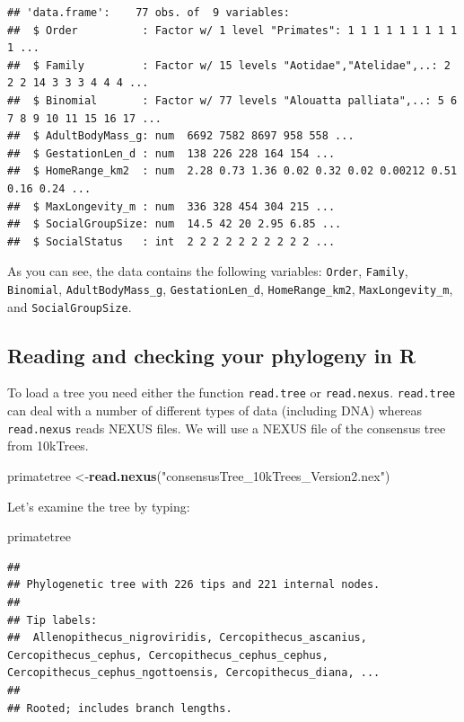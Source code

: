 \documentclass[]{book}
\newenvironment{Shaded}{\begin{snugshade}}{\end{snugshade}}
\newcommand{\KeywordTok}[1]{\textcolor[rgb]{0.13,0.29,0.53}{\textbf{{#1}}}}
\newcommand{\StringTok}[1]{\textcolor[rgb]{0.31,0.60,0.02}{{#1}}}
\newcommand{\NormalTok}[1]{{#1}}
\theoremstyle{definition}
\theoremstyle{definition}
\theoremstyle{definition}
\theoremstyle{remark}
\begin{document}
\begin{verbatim}
## 'data.frame':    77 obs. of  9 variables:
##  $ Order          : Factor w/ 1 level "Primates": 1 1 1 1 1 1 1 1 1 1 ...
##  $ Family         : Factor w/ 15 levels "Aotidae","Atelidae",..: 2 2 2 14 3 3 3 4 4 4 ...
##  $ Binomial       : Factor w/ 77 levels "Alouatta palliata",..: 5 6 7 8 9 10 11 15 16 17 ...
##  $ AdultBodyMass_g: num  6692 7582 8697 958 558 ...
##  $ GestationLen_d : num  138 226 228 164 154 ...
##  $ HomeRange_km2  : num  2.28 0.73 1.36 0.02 0.32 0.02 0.00212 0.51 0.16 0.24 ...
##  $ MaxLongevity_m : num  336 328 454 304 215 ...
##  $ SocialGroupSize: num  14.5 42 20 2.95 6.85 ...
##  $ SocialStatus   : int  2 2 2 2 2 2 2 2 2 2 ...
\end{verbatim}

As you can see, the data contains the following variables:
\texttt{Order}, \texttt{Family}, \texttt{Binomial},
\texttt{AdultBodyMass\_g}, \texttt{GestationLen\_d},
\texttt{HomeRange\_km2}, \texttt{MaxLongevity\_m}, and
\texttt{SocialGroupSize}.

\subsection{Reading and checking your phylogeny in
R}\label{reading-and-checking-your-phylogeny-in-r}

To load a tree you need either the function \texttt{read.tree} or
\texttt{read.nexus}. \texttt{read.tree} can deal with a number of
different types of data (including DNA) whereas \texttt{read.nexus}
reads NEXUS files. We will use a NEXUS file of the consensus tree from
10kTrees.

\begin{Shaded}
\begin{Highlighting}[]
\NormalTok{primatetree <-}\KeywordTok{read.nexus}\NormalTok{(}\StringTok{"consensusTree_10kTrees_Version2.nex"}\NormalTok{)}
\end{Highlighting}
\end{Shaded}

Let's examine the tree by typing:

\begin{Shaded}
\begin{Highlighting}[]
\NormalTok{primatetree}
\end{Highlighting}
\end{Shaded}

\begin{verbatim}
## 
## Phylogenetic tree with 226 tips and 221 internal nodes.
## 
## Tip labels:
##  Allenopithecus_nigroviridis, Cercopithecus_ascanius, Cercopithecus_cephus, Cercopithecus_cephus_cephus, Cercopithecus_cephus_ngottoensis, Cercopithecus_diana, ...
## 
## Rooted; includes branch lengths.
\end{verbatim}
\end{document}
